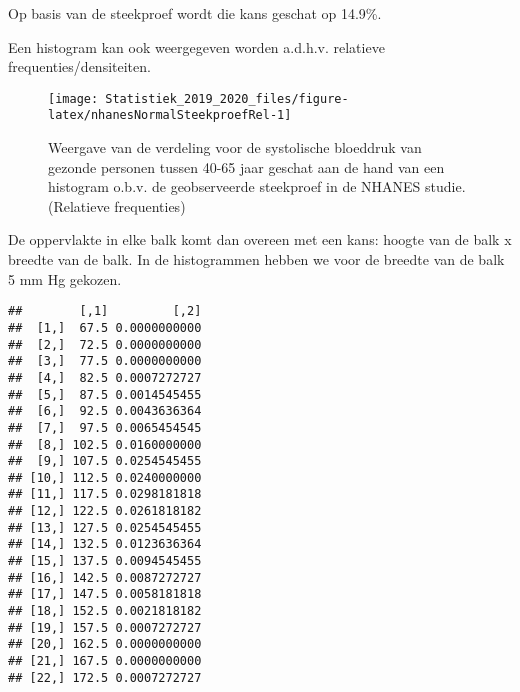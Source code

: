 \documentclass[12pt,dutch,coursenotes]{book}
\newenvironment{Shaded}{\begin{snugshade}}{\end{snugshade}}
\newcommand{\KeywordTok}[1]{\textcolor[rgb]{0.13,0.29,0.53}{\textbf{#1}}}
\newcommand{\DataTypeTok}[1]{\textcolor[rgb]{0.13,0.29,0.53}{#1}}
\newcommand{\DecValTok}[1]{\textcolor[rgb]{0.00,0.00,0.81}{#1}}
\newcommand{\FloatTok}[1]{\textcolor[rgb]{0.00,0.00,0.81}{#1}}
\newcommand{\StringTok}[1]{\textcolor[rgb]{0.31,0.60,0.02}{#1}}
\newcommand{\OtherTok}[1]{\textcolor[rgb]{0.56,0.35,0.01}{#1}}
\newcommand{\OperatorTok}[1]{\textcolor[rgb]{0.81,0.36,0.00}{\textbf{#1}}}
\newcommand{\NormalTok}[1]{#1}
\theoremstyle{definition}
\theoremstyle{definition}
\theoremstyle{definition}
\theoremstyle{remark}
\begin{document}
Op basis van de steekproef wordt die kans geschat op 14.9\%.

Een histogram kan ook weergegeven worden a.d.h.v. relatieve
frequenties/densiteiten.

\begin{Shaded}
\end{Shaded}

\begin{figure}

{\centering \texttt{[image: Statistiek\_2019\_2020\_files/figure-latex/nhanesNormalSteekproefRel-1]} 

}

\caption{Weergave van de verdeling voor de systolische bloeddruk van gezonde personen tussen 40-65 jaar geschat aan de hand van een histogram o.b.v. de geobserveerde steekproef in de NHANES studie. (Relatieve frequenties)}\label{fig:nhanesNormalSteekproefRel}
\end{figure}

De oppervlakte in elke balk komt dan overeen met een kans: hoogte van de
balk x breedte van de balk. In de histogrammen hebben we voor de breedte
van de balk 5 mm Hg gekozen.

\begin{Shaded}
\end{Shaded}

\begin{verbatim}
##        [,1]         [,2]
##  [1,]  67.5 0.0000000000
##  [2,]  72.5 0.0000000000
##  [3,]  77.5 0.0000000000
##  [4,]  82.5 0.0007272727
##  [5,]  87.5 0.0014545455
##  [6,]  92.5 0.0043636364
##  [7,]  97.5 0.0065454545
##  [8,] 102.5 0.0160000000
##  [9,] 107.5 0.0254545455
## [10,] 112.5 0.0240000000
## [11,] 117.5 0.0298181818
## [12,] 122.5 0.0261818182
## [13,] 127.5 0.0254545455
## [14,] 132.5 0.0123636364
## [15,] 137.5 0.0094545455
## [16,] 142.5 0.0087272727
## [17,] 147.5 0.0058181818
## [18,] 152.5 0.0021818182
## [19,] 157.5 0.0007272727
## [20,] 162.5 0.0000000000
## [21,] 167.5 0.0000000000
## [22,] 172.5 0.0007272727
\end{verbatim}
\end{document}
